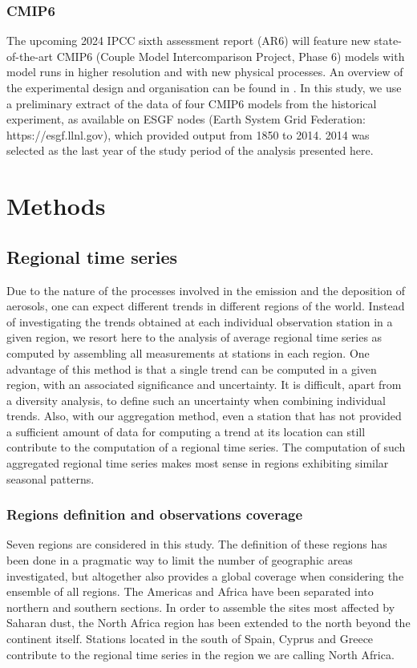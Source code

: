 \documentclass[acp, manuscript]{copernicus}
\begin{document}
\subsubsection{CMIP6}
The upcoming 2024 IPCC sixth assessment report (AR6) will feature new state-of-the-art CMIP6 (Couple Model Intercomparison Project, Phase 6) models with model runs in higher resolution and with new physical processes. An overview of the experimental design and organisation can be found in \cite{eyring2016overview}.  In this study, we use a preliminary extract of the data of four CMIP6 models from the historical experiment, as available on ESGF nodes (Earth System Grid Federation: https://esgf.llnl.gov), which provided output from 1850 to 2014. 2014 was selected as the last year of the study period of the analysis presented here.



\section{Methods}

\subsection{Regional time series}
Due to the nature of the processes involved in the emission and the deposition of aerosols, one can expect different trends in different regions of the world. Instead of investigating the trends obtained at each individual observation station in a given region, we resort here to the analysis of average regional time series as computed by assembling all measurements at stations in each region. One advantage of this method is that a single trend can be computed in a given region, with an associated significance and uncertainty. It is difficult, apart from a diversity analysis, to define such an uncertainty when combining individual trends. Also, with our aggregation method, even a station that has not provided a sufficient amount of data for computing a trend at its location can still contribute to the computation of a regional time series. The computation of such aggregated regional time series makes most sense in regions exhibiting similar seasonal patterns.

\subsubsection{Regions definition and observations coverage}
Seven regions are considered in this study. The definition of these regions has been done in a pragmatic way to limit the number of geographic areas investigated, but altogether also provides a global coverage when considering the ensemble of all regions. The Americas and Africa have been separated into northern and southern sections. In order to assemble the sites most affected by Saharan dust, the North Africa region has been extended to the north beyond the continent itself. Stations located in the south of Spain, Cyprus and Greece contribute to the regional time series in the region we are calling North Africa.
\end{document}
